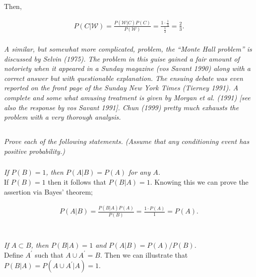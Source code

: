 \documentclass[12pt]{amsart}
\begin{document}
	Then,
	
	\begin{align*}
		P(C|\mathcal W) = \frac{ P(\mathcal W|C) P(C)}{P(\mathcal W)}
		= \frac{1\cdot\frac{1}{3}}{\frac{1}{2}}
		= \frac{2}{3}.
	\end{align*} \\
	
\textit{A similar, but somewhat more complicated, problem, the “Monte Hall problem” is discussed by Selvin (1975). 
	The problem in this guise gained a fair amount of notoriety when it appeared in a Sunday magazine (vos Savant 1990) along with a correct
	answer but with questionable explanation. The ensuing debate was even reported on the front page of the Sunday New York Times (Tierney 1991). 
	A complete and some what amusing treatment is given by Morgan et al. (1991) [see also the response by vos Savant 1991]. 
	Chun (1999) pretty much exhausts the problem with a very thorough analysis.} \\[2em]

\subsection{} %
\textit{Prove each of the following statements. (Assume that any conditioning event has positive probability.)}
	\subsubsection{} \textit{If \(P(B) = 1\), then \(P(A|B) = P(A)\) for any \(A\).} \\
	
		If \(P(B) = 1\) then it follows that \(P(B|A) = 1\). Knowing this we can prove the assertion via
		Bayes' theorem;
		
		\begin{align*}
			P(A|B) = \frac{P(B|A)P(A)}{P(B)} = \frac{1\cdot P(A)}{1} = P(A).
		\end{align*} \\
	
	
	\subsubsection{} \textit{If \(A \subset B\), then \(P(B|A) = 1\) and \(P(A|B) = P(A)/P(B)\).} \\
	
		Define \(A^\prime\) such that \(A\cup A^\prime = B\).
		Then we can illustrate that \(P(B|A) = P(A\cup A^\prime|A) = 1\).
	
\end{document}

